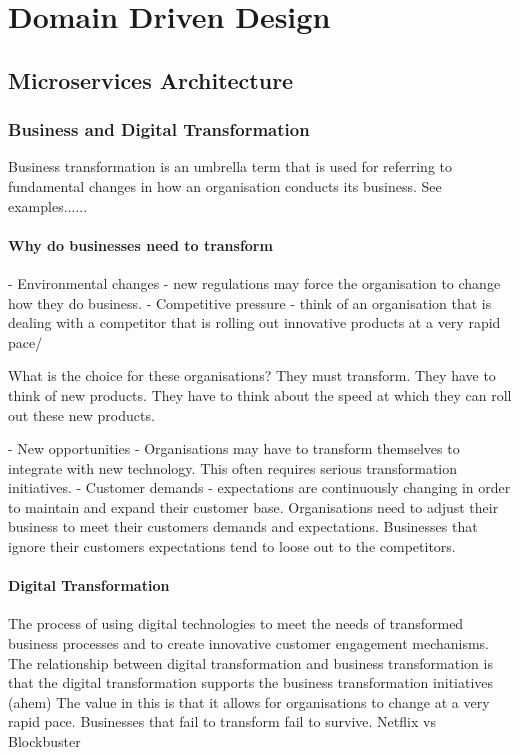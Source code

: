 \documentclass[a4paper, 11pt]{book}
\begin{document}
    \part{Domain Driven Design}


    \chapter{Microservices Architecture}


    \section{Business and Digital Transformation}
    Business transformation is an umbrella term that is used for referring to fundamental changes in how an organisation conducts its business.
    See examples......

    \subsection{Why do businesses need to transform}
    - Environmental changes - new regulations may force the organisation to change how they do business.
    - Competitive pressure - think of an organisation that is dealing with a competitor that is rolling out innovative products at a very rapid pace/

    What is the choice for these organisations?
    They must transform.
    They have to think of new products.
    They have to think about the speed at which they can roll out these new products.

    - New opportunities - Organisations may have to transform themselves to integrate with new technology.
    This often requires serious transformation initiatives.
    - Customer demands - expectations are continuously changing in order to maintain and expand their customer base.
    Organisations need to adjust their business to meet their customers demands and expectations.
    Businesses that ignore their customers expectations tend to loose out to the competitors.

    \subsection{Digital Transformation}
    The process of using digital technologies to meet the needs of transformed business processes and to create innovative customer engagement mechanisms.
    The relationship between digital transformation and business transformation is that the digital transformation supports the business transformation initiatives (ahem)
    The value in this is that it allows for organisations to change at a very rapid pace.
    Businesses that fail to transform fail to survive.
    Netflix vs Blockbuster
\end{document}
